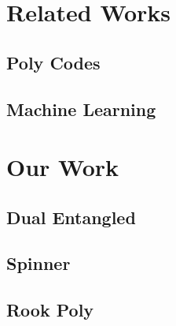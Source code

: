 \documentclass{report}
\begin{document}
\section{Related Works}

\subsection{Poly Codes}

\subsection{Machine Learning}




\section{Our Work}

\subsection{Dual Entangled}

\subsection{Spinner}

\subsection{Rook Poly}
\end{document}
